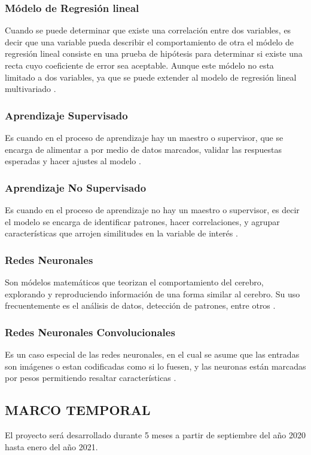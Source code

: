 \subsubsection{M\'odelo de Regresi\'on lineal}

\noindent
Cuando se puede determinar que existe una correlaci\'on entre dos variables, es decir que una variable pueda describir el comportamiento de otra el m\'odelo de regresi\'on lineal consiste en una prueba de hip\'otesis para determinar si existe una recta cuyo coeficiente de error sea aceptable. Aunque este m\'odelo no esta limitado a dos variables, ya que se puede extender al modelo de regresi\'on lineal multivariado \cite{ModeloRegresionLineal}.


\subsubsection{Aprendizaje Supervisado}

\noindent
Es cuando en el proceso de aprendizaje hay un maestro o supervisor, que se encarga de alimentar a por medio de datos marcados, validar las respuestas esperadas y hacer ajustes al modelo \cite{Aprendizaje}.

\subsubsection{Aprendizaje No Supervisado}

\noindent
Es cuando en el proceso de aprendizaje no hay un maestro o supervisor, es decir el modelo se encarga de identificar patrones, hacer correlaciones, y agrupar caracter\'isticas que arrojen similitudes en la variable de inter\'es \cite{Aprendizaje}.


\subsubsection{Redes Neuronales}

\noindent
Son m\'odelos matem\'aticos que teorizan el comportamiento del cerebro, explorando y reproduciendo informaci\'on de una forma similar al cerebro. Su uso frecuentemente es el an\'alisis de datos, detecci\'on de patrones, entre otros \cite{RedesNeuronales}.

\subsubsection{Redes Neuronales Convolucionales}

\noindent
Es un caso especial de las redes neuronales, en el cual se asume que las entradas son im\'agenes o estan codificadas como si lo fuesen, y las neuronas est\'an marcadas por pesos permitiendo resaltar caracter\'isticas \cite{RedesNeuronalesConvolucionales}.



\subsection{MARCO TEMPORAL}
\noindent El proyecto será desarrollado durante 5 meses a partir de septiembre del año 2020 hasta enero del año 2021.